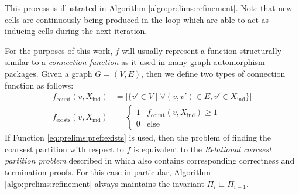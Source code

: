%		
%		
%		
%		

		
		This process is illustrated in Algorithm \ref{algo:prelims:refinement}. Note that new cells are continuously being produced in the loop which are able to act as inducing cells during the next iteration. 
		
		For the purposes of this work, $f$ will usually represent a function structurally similar to a \textit{connection function} as it used in many graph automorphism packages.
		Given a graph $G = (V, E)$, then we define two types of connection function as follows:
		\begin{align}
			f_{\mathrm{count}}(v, X_{\mathrm{ind}}) &= \left| \{ v' \in V \mid \forall (v, v') \in E, v' \in X_{\mathrm{ind}} \} \right| \label{eq:prelims:pref:count} \\
			f_{\mathrm{exists}}(v, X_{\mathrm{ind}}) &= \begin{cases}
				1 & f_{\mathrm{count}}(v, X_{\mathrm{ind}}) \geq 1 \label{eq:prelims:pref:exists} \\
				0 & \mathrm{else}
			\end{cases}
		\end{align}
		If Function \ref{eq:prelims:pref:exists} is used, then the problem of finding the coarsest partition with respect to $f$ is equivalent to the \textit{Relational coarsest partition problem} described in  \cite{paigeThreePartitionRefinement1987} which also contains corresponding correctness and termination proofs.
		For this case in particular, Algorithm \ref{algo:prelims:refinement} always maintains the invariant $\Pi_i \sqsubseteq \Pi_{i-1}$.
		
